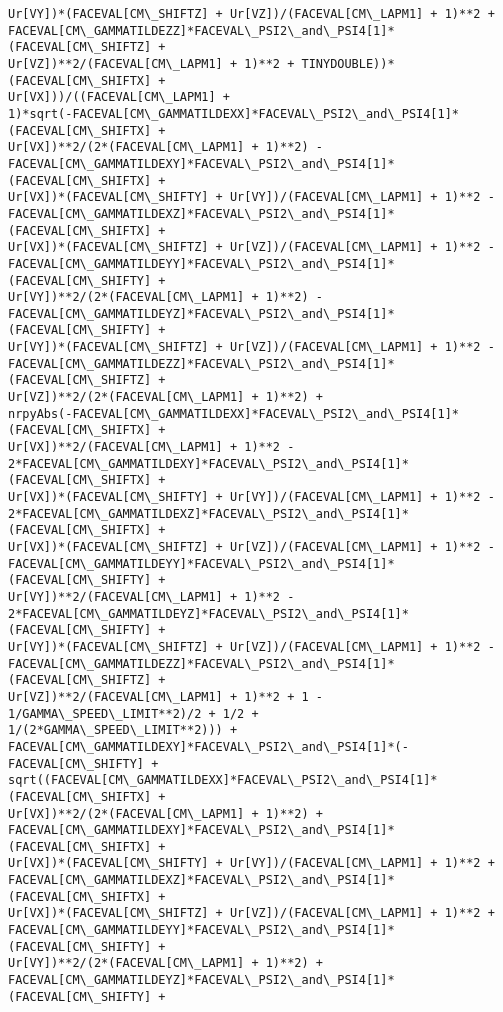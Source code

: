 \documentclass[landscape,letterpaper,10pt,english]{article}
\begin{document}
\begin{Verbatim}[commandchars=\\\{\}]
Ur[VY])*(FACEVAL[CM\_SHIFTZ] + Ur[VZ])/(FACEVAL[CM\_LAPM1] + 1)**2 +
FACEVAL[CM\_GAMMATILDEZZ]*FACEVAL\_PSI2\_and\_PSI4[1]*(FACEVAL[CM\_SHIFTZ] +
Ur[VZ])**2/(FACEVAL[CM\_LAPM1] + 1)**2 + TINYDOUBLE))*(FACEVAL[CM\_SHIFTX] +
Ur[VX]))/((FACEVAL[CM\_LAPM1] +
1)*sqrt(-FACEVAL[CM\_GAMMATILDEXX]*FACEVAL\_PSI2\_and\_PSI4[1]*(FACEVAL[CM\_SHIFTX] +
Ur[VX])**2/(2*(FACEVAL[CM\_LAPM1] + 1)**2) -
FACEVAL[CM\_GAMMATILDEXY]*FACEVAL\_PSI2\_and\_PSI4[1]*(FACEVAL[CM\_SHIFTX] +
Ur[VX])*(FACEVAL[CM\_SHIFTY] + Ur[VY])/(FACEVAL[CM\_LAPM1] + 1)**2 -
FACEVAL[CM\_GAMMATILDEXZ]*FACEVAL\_PSI2\_and\_PSI4[1]*(FACEVAL[CM\_SHIFTX] +
Ur[VX])*(FACEVAL[CM\_SHIFTZ] + Ur[VZ])/(FACEVAL[CM\_LAPM1] + 1)**2 -
FACEVAL[CM\_GAMMATILDEYY]*FACEVAL\_PSI2\_and\_PSI4[1]*(FACEVAL[CM\_SHIFTY] +
Ur[VY])**2/(2*(FACEVAL[CM\_LAPM1] + 1)**2) -
FACEVAL[CM\_GAMMATILDEYZ]*FACEVAL\_PSI2\_and\_PSI4[1]*(FACEVAL[CM\_SHIFTY] +
Ur[VY])*(FACEVAL[CM\_SHIFTZ] + Ur[VZ])/(FACEVAL[CM\_LAPM1] + 1)**2 -
FACEVAL[CM\_GAMMATILDEZZ]*FACEVAL\_PSI2\_and\_PSI4[1]*(FACEVAL[CM\_SHIFTZ] +
Ur[VZ])**2/(2*(FACEVAL[CM\_LAPM1] + 1)**2) +
nrpyAbs(-FACEVAL[CM\_GAMMATILDEXX]*FACEVAL\_PSI2\_and\_PSI4[1]*(FACEVAL[CM\_SHIFTX] +
Ur[VX])**2/(FACEVAL[CM\_LAPM1] + 1)**2 -
2*FACEVAL[CM\_GAMMATILDEXY]*FACEVAL\_PSI2\_and\_PSI4[1]*(FACEVAL[CM\_SHIFTX] +
Ur[VX])*(FACEVAL[CM\_SHIFTY] + Ur[VY])/(FACEVAL[CM\_LAPM1] + 1)**2 -
2*FACEVAL[CM\_GAMMATILDEXZ]*FACEVAL\_PSI2\_and\_PSI4[1]*(FACEVAL[CM\_SHIFTX] +
Ur[VX])*(FACEVAL[CM\_SHIFTZ] + Ur[VZ])/(FACEVAL[CM\_LAPM1] + 1)**2 -
FACEVAL[CM\_GAMMATILDEYY]*FACEVAL\_PSI2\_and\_PSI4[1]*(FACEVAL[CM\_SHIFTY] +
Ur[VY])**2/(FACEVAL[CM\_LAPM1] + 1)**2 -
2*FACEVAL[CM\_GAMMATILDEYZ]*FACEVAL\_PSI2\_and\_PSI4[1]*(FACEVAL[CM\_SHIFTY] +
Ur[VY])*(FACEVAL[CM\_SHIFTZ] + Ur[VZ])/(FACEVAL[CM\_LAPM1] + 1)**2 -
FACEVAL[CM\_GAMMATILDEZZ]*FACEVAL\_PSI2\_and\_PSI4[1]*(FACEVAL[CM\_SHIFTZ] +
Ur[VZ])**2/(FACEVAL[CM\_LAPM1] + 1)**2 + 1 - 1/GAMMA\_SPEED\_LIMIT**2)/2 + 1/2 +
1/(2*GAMMA\_SPEED\_LIMIT**2))) +
FACEVAL[CM\_GAMMATILDEXY]*FACEVAL\_PSI2\_and\_PSI4[1]*(-FACEVAL[CM\_SHIFTY] +
sqrt((FACEVAL[CM\_GAMMATILDEXX]*FACEVAL\_PSI2\_and\_PSI4[1]*(FACEVAL[CM\_SHIFTX] +
Ur[VX])**2/(2*(FACEVAL[CM\_LAPM1] + 1)**2) +
FACEVAL[CM\_GAMMATILDEXY]*FACEVAL\_PSI2\_and\_PSI4[1]*(FACEVAL[CM\_SHIFTX] +
Ur[VX])*(FACEVAL[CM\_SHIFTY] + Ur[VY])/(FACEVAL[CM\_LAPM1] + 1)**2 +
FACEVAL[CM\_GAMMATILDEXZ]*FACEVAL\_PSI2\_and\_PSI4[1]*(FACEVAL[CM\_SHIFTX] +
Ur[VX])*(FACEVAL[CM\_SHIFTZ] + Ur[VZ])/(FACEVAL[CM\_LAPM1] + 1)**2 +
FACEVAL[CM\_GAMMATILDEYY]*FACEVAL\_PSI2\_and\_PSI4[1]*(FACEVAL[CM\_SHIFTY] +
Ur[VY])**2/(2*(FACEVAL[CM\_LAPM1] + 1)**2) +
FACEVAL[CM\_GAMMATILDEYZ]*FACEVAL\_PSI2\_and\_PSI4[1]*(FACEVAL[CM\_SHIFTY] +

\end{Verbatim}
\end{document}
